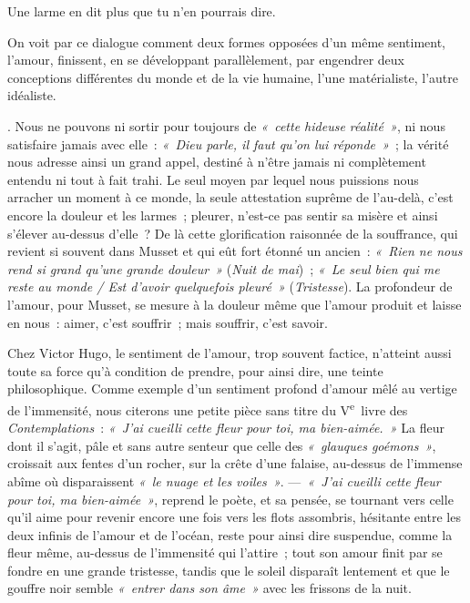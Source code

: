 \documentclass[french,twoside]{book} %
\def\mednobreak{\ifdim\lastskip<\medskipamount
  \removelastskip\nopagebreak\medskip\fi}
\newcommand{\labelblock}[1]{\medbreak{\noindent\color{rubric}\bfseries #1}\par\mednobreak}
\begin{document}
{\labelblock{Albert.}

Une larme en dit plus que tu n’en pourrais dire.\\
\par
\noindent On voit par ce dialogue comment deux formes opposées d’un même sentiment, l’amour, finissent, en se développant parallèlement, par engendrer deux conceptions différentes du monde et de la vie humaine, l’une matérialiste, l’autre idéaliste.
}. Nous ne pouvons ni sortir pour toujours de \emph{« cette hideuse réalité »},  ni nous satisfaire jamais avec elle : \emph{« Dieu parle, il faut qu’on lui réponde »} ; la vérité nous adresse ainsi un grand appel, destiné à n’être jamais ni complètement entendu ni tout à fait trahi. Le seul moyen par lequel nous puissions nous arracher un moment à ce monde, la seule attestation suprême de l’au-delà, c’est encore la douleur et les larmes ; pleurer, n’est-ce pas sentir sa misère et ainsi s’élever au-dessus d’elle ? De là cette glorification raisonnée de la souffrance, qui revient si souvent dans Musset et qui eût fort étonné un ancien : \emph{« Rien ne nous rend si grand qu’une grande douleur »} (\emph{Nuit de mai}) ; \emph{« Le seul bien qui me reste au monde / Est d’avoir quelquefois pleuré »} (\emph{Tristesse}). La profondeur de l’amour, pour Musset, se mesure à la douleur même que l’amour produit et laisse en nous : aimer, c’est souffrir ; mais souffrir, c’est savoir.\par
Chez Victor Hugo, le sentiment de l’amour, trop souvent factice, n’atteint aussi toute sa force qu’à condition de prendre, pour ainsi dire, une teinte philosophique. Comme exemple d’un sentiment profond d’amour mêlé au vertige de l’immensité, nous citerons une petite pièce sans titre du V\textsuperscript{e} livre des \emph{Contemplations} : \emph{« J’ai cueilli cette fleur pour toi, ma bien-aimée. »} La fleur dont il s’agit, pâle et sans autre senteur que celle des \emph{« glauques goémons »}, croissait aux fentes d’un rocher, sur la crête d’une falaise, au-dessus de l’immense abîme où disparaissent \emph{« le nuage et les voiles »}. — \emph{« J’ai cueilli cette fleur pour toi, ma bien-aimée »}, reprend le poète, et sa pensée, se tournant vers celle qu’il aime pour revenir encore une fois vers les flots assombris, hésitante entre les deux infinis de l’amour  et de l’océan, reste pour ainsi dire suspendue, comme la fleur même, au-dessus de l’immensité qui l’attire ; tout son amour finit par se fondre en une grande tristesse, tandis que le soleil disparaît lentement et que le gouffre noir semble \emph{« entrer dans son âme »} avec les frissons de la nuit.\par
\end{document}
